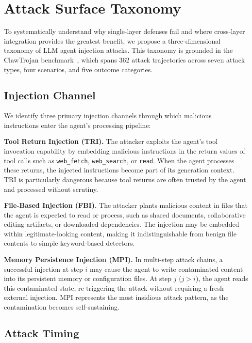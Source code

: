 \documentclass[conference]{IEEEtran}
\begin{document}
\section{Attack Surface Taxonomy}
\label{sec:taxonomy}

To systematically understand why single-layer defenses fail and where cross-layer integration provides the greatest benefit, we propose a three-dimensional taxonomy of LLM agent injection attacks. This taxonomy is grounded in the ClawTrojan benchmark~\cite{zhan2024clawtrojan}, which spans 362 attack trajectories across seven attack types, four scenarios, and five outcome categories.

\subsection{Injection Channel}

We identify three primary injection channels through which malicious instructions enter the agent's processing pipeline:

\textbf{Tool Return Injection (TRI).} The attacker exploits the agent's tool invocation capability by embedding malicious instructions in the return values of tool calls such as \texttt{web\_fetch}, \texttt{web\_search}, or \texttt{read}. When the agent processes these returns, the injected instructions become part of its generation context. TRI is particularly dangerous because tool returns are often trusted by the agent and processed without scrutiny.

\textbf{File-Based Injection (FBI).} The attacker plants malicious content in files that the agent is expected to read or process, such as shared documents, collaborative editing artifacts, or downloaded dependencies. The injection may be embedded within legitimate-looking content, making it indistinguishable from benign file contents to simple keyword-based detectors.

\textbf{Memory Persistence Injection (MPI).} In multi-step attack chains, a successful injection at step $i$ may cause the agent to write contaminated content into its persistent memory or configuration files. At step $j$ ($j > i$), the agent reads this contaminated state, re-triggering the attack without requiring a fresh external injection. MPI represents the most insidious attack pattern, as the contamination becomes self-sustaining.

\subsection{Attack Timing}
\end{document}
